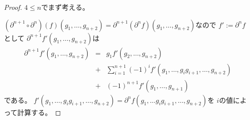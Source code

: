 \documentclass[../master_galois_theory]{subfiles}
\begin{document}
\begin{proof}
  $4 \leq n$でまず考える。

  $(\partial^{n+1} \circ \partial^n)(f)(g_1 , \dots , g_{n+2}) = \partial^{n+1}(\partial^n f)(g_1 , \dots , g_{n+2})$なので
  $f' := \partial^n f$として $\partial^{n+1}f'(g_1 , \dots , g_{n+2})$は
  \begin{eqnarray*}
    \partial^{n+1}f'(g_1 , \dots , g_{n+2}) & = & g_1 f'(g_2 , \dots , g_{n+2}) \\
    & + & \sum_{i=1}^{n+1} (-1)^i f'(g_1 , \dots , g_i g_{i+1} , \dots , g_{n+2}) \\
    & + & (-1)^{n+1} f'(g_1 , \dots , g_{n+1})
  \end{eqnarray*}
  である。
  $f'(g_1 , \dots , g_i g_{i+1} , \dots , g_{n+2}) = \partial^n f(g_1 , \dots g_i g_{i+1} , \dots , g_{n+2})$を $i$の値によって計算する。


\end{proof}
\end{document}
